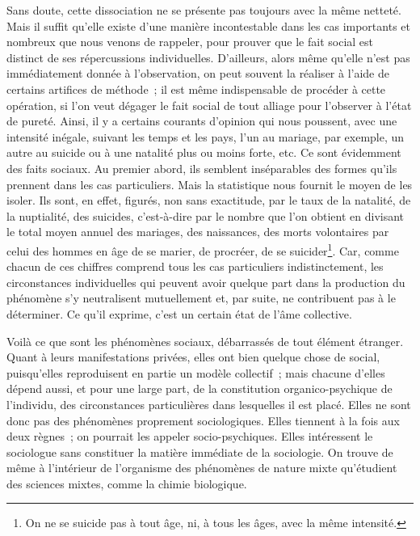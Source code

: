 \documentclass[french,twoside]{book} %
\begin{document}
Sans doute, cette dissociation ne se présente pas toujours avec la même netteté. Mais il suffit qu’elle existe d’une manière incontestable dans les cas importants et nombreux que nous venons de rappeler, pour prouver que le fait social est distinct de ses répercussions individuelles. D’ailleurs, alors même qu’elle n’est pas immédiatement donnée à l’observation, on peut souvent la réaliser à l’aide de certains artifices de méthode ; il est même indispensable de procéder à cette opération, si l’on veut dégager le fait social de tout alliage pour l’observer à l’état de pureté. Ainsi, il y a certains courants d’opinion qui nous poussent, avec une intensité inégale, suivant les temps et les pays, l’un au mariage, par exemple, un autre au suicide ou à une natalité plus ou moins forte, etc. Ce sont évidemment des faits sociaux. Au premier abord, ils semblent inséparables des formes qu’ils prennent dans les cas particuliers. Mais la statistique nous fournit le moyen de les isoler. Ils sont, en effet, figurés, non sans exactitude, par le taux de la natalité, de la nuptialité, des suicides, c’est-à-dire par le nombre que l’on obtient en divisant le total moyen annuel des mariages, des naissances, des morts volontaires par celui des hommes en âge de se marier, de procréer, de se suicider\footnote{ On ne se suicide pas à tout âge, ni, à tous les âges, avec la même intensité.}. Car, comme chacun de ces chiffres comprend tous les cas particuliers indistinctement, les circonstances individuelles qui peuvent avoir quelque part dans la production du phénomène s’y neutralisent mutuellement et, par suite, ne contribuent pas à le déterminer. Ce qu’il exprime, c’est un certain état de l’âme collective.\par
Voilà ce que sont les phénomènes sociaux, débarrassés de tout élément étranger. Quant à leurs manifestations privées, elles ont bien quelque chose de social, puisqu’elles reproduisent en partie un modèle collectif ; mais chacune d’elles dépend aussi, et pour une large part, de la constitution organico-psychique de l’individu, des circonstances particulières dans lesquelles il est placé. Elles ne sont donc pas des phénomènes proprement sociologiques. Elles tiennent à la fois aux deux règnes ; on pourrait les appeler socio-psychiques. Elles intéressent le sociologue sans constituer la matière immédiate de la sociologie. On trouve de même à l’intérieur de l’organisme des phénomènes de nature mixte qu’étudient des sciences mixtes, comme la chimie biologique.\par
\end{document}
